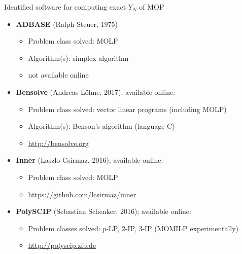\documentclass[10pt,xcolor=dvipsnames]{beamer}
\begin{document}
\begin{frame}{Identified software for computing exact $Y_N$ of MOP}


\begin{itemize}
  \item \textbf{ADBASE} (Ralph Steuer, 1975)
    \begin{itemize}
      \item       {\footnotesize Problem class solved: MOLP}
      \item       {\footnotesize Algorithm(s): simplex algorithm}
      \item       {\footnotesize not available online}
    \end{itemize}
    \vspace{3mm}
%    
  \item \textbf{Bensolve} (Andreas L\"ohne, 2017); available online:
 
    \begin{itemize}
      \item       {\footnotesize Problem class solved: vector linear programs (including MOLP)}
      \item       {\footnotesize Algorithm(s): Benson's algorithm (language C)}
      \item       {\footnotesize \url{http://bensolve.org}}
    \end{itemize}
     \vspace{3mm}    
%
  \item \textbf{Inner} (Laszlo Csirmaz, 2016); available online:
    \begin{itemize}
      \item       {\footnotesize Problem class solved: MOLP}
      \item       {\footnotesize \url{https://github.com/lcsirmaz/inner}}
    \end{itemize}
     \vspace{3mm}    
%
  \item \textbf{PolySCIP} (Sebastian Schenker, 2016); available online:
    \begin{itemize}
      \item       {\footnotesize Problem classes solved: $p$-LP, $2$-IP, $3$-IP (MOMILP experimentally)}
      \item       {\footnotesize  \url{http://polyscip.zib.de} }
    \end{itemize}
\end{itemize}

\end{frame}
\end{document}
